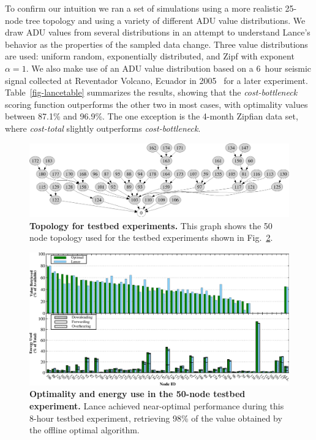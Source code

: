 To confirm our intuition we ran a set of simulations using a more realistic
25-node tree topology and using a variety of different ADU value
distributions.  We draw ADU values from several distributions in an attempt to
understand Lance's behavior as the properties of the sampled data change.
Three value distributions are used: uniform random, exponentially distributed,
and Zipf with exponent $\alpha = 1$.  We also make use of an ADU value
distribution based on a 6~hour seismic signal collected at Reventador Volcano,
Ecuador in 2005~\cite{volcano-osdi06} for a later experiment.
Table~\ref{fig-lancetable} summarizes the results, showing that the {\em
cost-bottleneck} scoring function outperforms the other two in most cases,
with optimality values between 87.1\% and 96.9\%.  The one exception is the
4-month Zipfian data set, where \emph{cost-total} slightly outperforms
\emph{cost-bottleneck}.

\begin{figure}[t]
\begin{center}
\includegraphics[width=1.0\hsize]{./figs/Sensys2008/2008-lance-testbed-topology.eps}
\end{center}
\caption{{\bf Topology for testbed experiments.} 
This graph shows the 50 node topology used for the testbed experiments shown
in Fig.~\ref{fig-lance-testbed}.}
\label{fig-lance-testbed-topology}
\end{figure}

\begin{figure}[t]
\begin{center}
\includegraphics[width=1.0\hsize]{./figs/Sensys2008/2008-lance-testbed.eps}
\end{center}
\caption{{\bf Optimality and energy use in the 50-node testbed experiment.}
Lance achieved near-optimal performance during this 8-hour testbed
experiment, retrieving 98\% of the value obtained by the offline optimal
algorithm.}
\label{fig-lance-testbed}
\end{figure}

